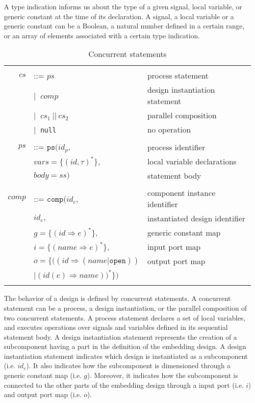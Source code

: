 A type indication informs us about the type of a given signal, local
variable, or generic constant at the time of its declaration. A
signal, a local variable or a generic constant can be a Boolean, a
natural number defined in a certain range, or an array of elements
associated with a certain type indication.

\begin{table}[!htbp]
  \caption{Concurrent statements}
  \label{tab:cs}
  \begin{tabular}{|rll|}
    \hline
    & & \\
    $cs$ & ::= $ps$ & process statement \\
    & $\vert{}~$ $comp$ & design instantiation statement \\
    & $\vert{}~$ $cs_1~\mathtt{||}~cs_2$ & parallel composition \\
    & $\vert{}~$ \texttt{null} & no operation \\
    & & \\
    $ps$ & ::= $\mathtt{ps}(id_p,$ & process identifier \\
    & \quad\quad\quad${}vars=\{(id,\tau)^{*}\},$ & local variable declarations\\
    & \quad\quad\quad${}body=ss)$ & statement body \\
    & & \\
    $comp$ & ::= $\mathtt{comp}(id_c,$ & component instance identifier \\
      & \quad\quad\quad\quad$id_e,$ & instantiated design identifier \\
      & \quad\quad\quad\quad${}g=\{(id\Rightarrow{}e)^{*}\},$ & generic constant map \\
      & \quad\quad\quad\quad${}i=\{(name\Rightarrow{}e)^{*}\},$ & input port map \\
    & \quad\quad\quad\quad$o=\{\big((id\Rightarrow{}(name\vert{}\mathtt{open}))$ & output port map \\
    & \quad\quad\quad\quad\quad\quad\quad$\big\vert{}(id(e)\Rightarrow{}name)\big)^{*}\})$ &  \\
    & & \\
    \hline
  \end{tabular}

\end{table}

The behavior of a design is defined by concurrent statements. A
concurrent statement can be a process, a design instantiation, or the
parallel composition of two concurrent statements. A process statement
declares a set of local variables, and executes operations over
signals and variables defined in its sequential statement body. A
design instantiation statement represents the creation of a
subcomponent having a part in the definition of the embedding
design. A design instantiation statement indicates which design is
instantiated as a subcomponent (i.e. $id_e$). It also indicates how
the subcomponent is dimensioned through a generic constant map
(i.e. $g$). Moreover, it indicates how the subcomponent is connected
to the other parts of the embedding design through a input port
(i.e. $i$) and output port map (i.e. $o$).

